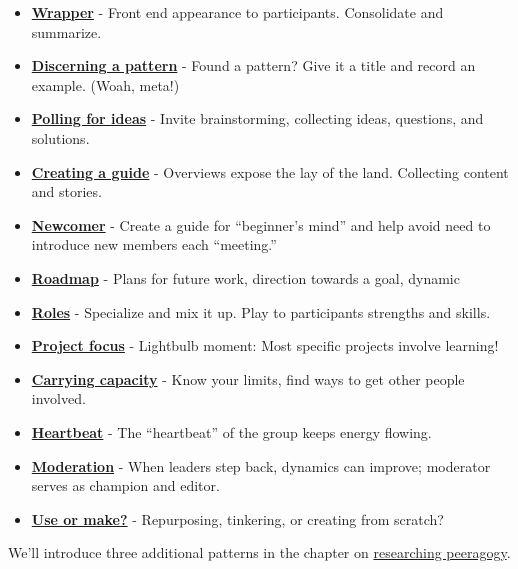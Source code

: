 \begin{itemize}
\item
  \textbf{\href{http://peeragogy.org/patterns/wrapper/}{Wrapper}} - Front end
  appearance to participants. Consolidate and summarize.
\item
  \textbf{\href{http://peeragogy.org/patterns/discerning-a-pattern/}{Discerning
  a pattern}} - Found a pattern? Give it a title and record an example.
  (Woah, meta!)
\item
  \textbf{\href{http://peeragogy.org/patterns/polling-for-ideas/}{Polling for
  ideas}} - Invite brainstorming, collecting ideas, questions, and
  solutions.
\item
  \textbf{\href{http://peeragogy.org/patterns/creating-a-guide/}{Creating a
  guide}} - Overviews expose the lay of the land. Collecting content and
  stories.
\item
  \textbf{\href{http://peeragogy.org/patterns/newcomer/}{Newcomer}} - Create a
  guide for ``beginner's mind'' and help avoid need to introduce new
  members each ``meeting.''
\item
  \textbf{\href{http://peeragogy.org/patterns/roadmap/}{Roadmap}} - Plans for
  future work, direction towards a goal, dynamic
\item
  \textbf{\href{http://peeragogy.org/patterns/roles/}{Roles}} - Specialize and
  mix it up. Play to participants strengths and skills.
\item
  \textbf{\href{http://peeragogy.org/focusing-on-a-specific-project/}{Project
  focus}} - Lightbulb moment: Most specific projects involve learning!
\item
  \textbf{\href{http://peeragogy.org/patterns/carrying-capacity/}{Carrying
  capacity}} - Know your limits, find ways to get other people involved.
\item
  \textbf{\href{http://peeragogy.org/patterns/heartbeat/}{Heartbeat}} - The
  ``heartbeat'' of the group keeps energy flowing.
\item
  \textbf{\href{http://peeragogy.org/patterns/moderation/}{Moderation}} - When
  leaders step back, dynamics can improve; moderator serves as champion
  and editor.
\item
  \textbf{\href{http://peeragogy.org/patterns/praxis-vs-poeisis/}{Use or make?}}
  - Repurposing, tinkering, or creating from scratch?
\end{itemize}
We'll introduce three additional patterns in the chapter on
\href{http://peeragogy.org/to-peeragogy/researching-peeragogy/}{researching
peeragogy}.

